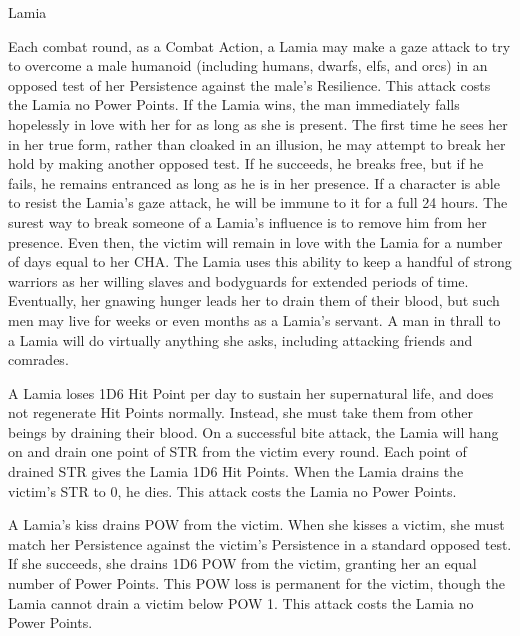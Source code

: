 \begin{monsterbox}{Lamia}
\begin{rpg-monsteraction}
		Each combat round, as a Combat Action, a Lamia may make a gaze attack to try to overcome a male humanoid (including humans, dwarfs, elfs, and orcs) in an opposed test of her Persistence against the male’s Resilience. This attack costs the Lamia no Power Points. If the Lamia wins, the man immediately falls hopelessly in love with her for as long as she is present. The first time he sees her in her true form, rather than cloaked in an illusion, he may attempt to break her hold by making another opposed test. If he succeeds, he breaks free, but if he fails, he remains entranced as long as he is in her presence. If a character is able to resist the Lamia’s gaze attack, he will be immune to it for a full 24 hours. The surest way to break someone of a Lamia’s influence is to remove him from her presence. Even then, the victim will remain in love with the Lamia for a number of days equal to her CHA. The Lamia uses this ability to keep a handful of strong warriors as her willing slaves and bodyguards for extended periods of time. Eventually, her gnawing hunger leads her to drain them of their blood, but such men may live for weeks or even months as a Lamia’s servant. A man in thrall to a Lamia will do virtually anything she asks, including attacking friends and comrades.
	\end{rpg-monsteraction}
	\begin{rpg-monsteraction}
		A Lamia loses 1D6 Hit Point per day to sustain her supernatural life, and does not regenerate Hit Points normally. Instead, she must take them from other beings by draining their blood. On a successful bite attack, the Lamia will hang on and drain one point of STR from the victim every round. Each point of drained STR gives the Lamia 1D6 Hit Points. When the Lamia drains the victim’s STR to 0, he dies. This attack costs the Lamia no Power Points.
	\end{rpg-monsteraction}
	\begin{rpg-monsteraction}
		A Lamia’s kiss drains POW from the victim. When she kisses a victim, she must match her Persistence against the victim’s Persistence in a standard opposed test. If she succeeds, she drains 1D6 POW from the victim, granting her an equal number of Power Points. This POW loss is permanent for the victim, though the Lamia cannot drain a victim below POW 1. This attack costs the Lamia no Power Points.
	\end{rpg-monsteraction}

\end{monsterbox}

